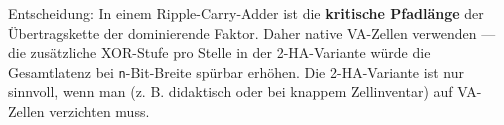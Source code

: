 \documentclass[11pt, a4paper]{article}
\begin{document}
Entscheidung: In einem Ripple-Carry-Adder ist die \textbf{kritische Pfadlänge} der Übertragskette der dominierende Faktor. Daher native VA-Zellen verwenden — die zusätzliche XOR-Stufe pro Stelle in der 2-HA-Variante würde die Gesamtlatenz bei \texttt{n}-Bit-Breite spürbar erhöhen. Die 2-HA-Variante ist nur sinnvoll, wenn man (z. B. didaktisch oder bei knappem Zellinventar) auf VA-Zellen verzichten muss.





\end{document}
